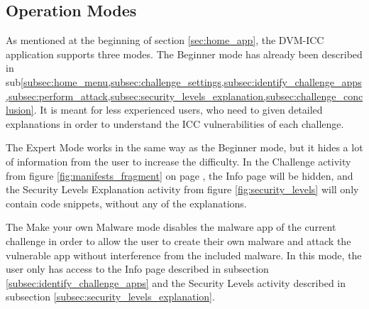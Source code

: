     \subsection{Operation Modes}
        \label{subsec:challenge_modes}
    
    As mentioned at the beginning of section \ref{sec:home_app}, the DVM-ICC application supports three modes. The Beginner mode has already been described in sub\cref{subsec:home_menu,subsec:challenge_settings,subsec:identify_challenge_apps,subsec:perform_attack,subsec:security_levels_explanation,subsec:challenge_conclusion}. It is meant for less experienced users, who need to given detailed explanations in order to understand the ICC vulnerabilities of each challenge.
    
    The Expert Mode works in the same way as the Beginner mode, but it hides a lot of information from the user to increase the difficulty. In the Challenge activity from figure \ref{fig:manifests_fragment} on page \pageref{fig:manifests_fragment}, the Info page will be hidden, and the Security Levels Explanation activity from figure \ref{fig:security_levels} will only contain code snippets, without any of the explanations.
    
    The Make your own Malware mode disables the malware app of the current challenge in order to allow the user to create their own malware and attack the vulnerable app without interference from the included malware. In this mode, the user only has access to the Info page described in subsection \ref{subsec:identify_challenge_apps} and the Security Levels activity described in subsection \ref{subsec:security_levels_explanation}.
    